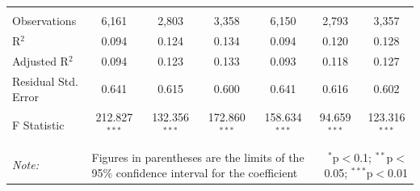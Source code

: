 \documentclass[alpha-refs]{wiley-article-01g}
\begin{document}
\begin{landscape}
\begin{table}[!htbp]
\begin{tabular}{@{\extracolsep{5pt}}lcccccc}
  & & & & & & \\ 
\hline \\[-3ex] 
Observations & 6,161 & 2,803 & 3,358 & 6,150 & 2,793 & 3,357 \\ 
R$^{2}$ & 0.094 & 0.124 & 0.134 & 0.094 & 0.120 & 0.128 \\ 
Adjusted R$^{2}$ & 0.094 & 0.123 & 0.133 & 0.093 & 0.118 & 0.127 \\ 
Residual Std. Error & 0.641 & 0.615 & 0.600 & 0.641 & 0.616 & 0.602 \\ 
F Statistic & 212.827$^{***}$ & 132.356$^{***}$ & 172.860$^{***}$ & 158.634$^{***}$ & 94.659$^{***}$ & 123.316$^{***}$ \\ 
\hline 
\hline \\[-3ex] 
\textit{Note:} &\multicolumn{4}{l}{Figures in parentheses are the limits of the 95\% confidence interval for the coefficient}  & \multicolumn{2}{r}{$^{*}$p$<$0.1; $^{**}$p$<$0.05; $^{***}$p$<$0.01} \\ 
\end{tabular} 
\end{table} 

\end{landscape}

\newpage
\end{document}
